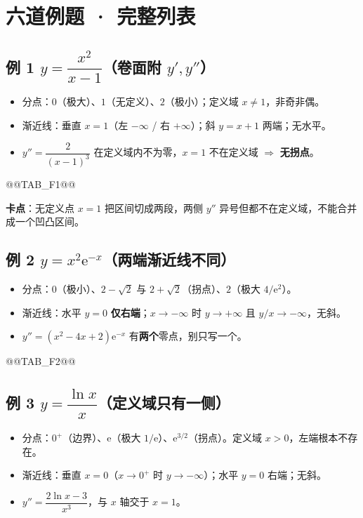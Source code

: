 \documentclass[11pt,a4paper]{ctexart}
\newcommand{\ee}{\mathrm{e}}
\begin{document}
\section{六道例题 · 完整列表}

\subsection{例 1 $y=\dfrac{x^2}{x-1}$（卷面附 $y',y''$）}

\begin{itemize}[label=$\bullet$,leftmargin=1.5em]
\item 分点：$0$（极大）、$1$（无定义）、$2$（极小）；定义域 $x\ne1$，非奇非偶。
\item 渐近线：垂直 $x=1$（左 $-\infty$ / 右 $+\infty$）；斜 $y=x+1$ 两端；无水平。
\item $y''=\dfrac{2}{(x-1)^3}$ 在定义域内不为零，$x=1$ 不在定义域 $\Rightarrow$ \textbf{无拐点}。
\end{itemize}

@@TAB_F1@@

\noindent\textbf{卡点}：无定义点 $x=1$ 把区间切成两段，两侧 $y''$ 异号但都不在定义域，不能合并成一个凹凸区间。

\subsection{例 2 $y=x^2\ee^{-x}$（两端渐近线不同）}

\begin{itemize}[label=$\bullet$,leftmargin=1.5em]
\item 分点：$0$（极小）、$2-\sqrt2$ 与 $2+\sqrt2$（拐点）、$2$（极大 $4/\ee^2$）。
\item 渐近线：水平 $y=0$ \textbf{仅右端}；$x\to-\infty$ 时 $y\to+\infty$ 且 $y/x\to-\infty$，无斜。
\item $y''=(x^2-4x+2)\ee^{-x}$ 有\textbf{两个}零点，别只写一个。
\end{itemize}

@@TAB_F2@@

\subsection{例 3 $y=\dfrac{\ln x}{x}$（定义域只有一侧）}

\begin{itemize}[label=$\bullet$,leftmargin=1.5em]
\item 分点：$0^+$（边界）、$\ee$（极大 $1/\ee$）、$\ee^{3/2}$（拐点）。定义域 $x>0$，左端根本不存在。
\item 渐近线：垂直 $x=0$（$x\to0^+$ 时 $y\to-\infty$）；水平 $y=0$ 右端；无斜。
\item $y''=\dfrac{2\ln x-3}{x^3}$，与 $x$ 轴交于 $x=1$。
\end{itemize}
\end{document}
